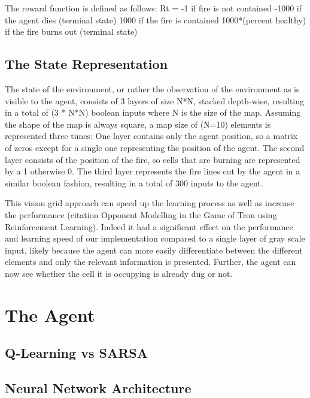 The reward function is defined as follows:
Rt = -1 if fire is not contained
    -1000 if the agent dies (terminal state)
    1000 if the fire is contained
    1000*(percent healthy) if the fire burns out (terminal state)


\subsection{The State Representation}\label{sec:state_rep}
The state of the environment, or rather the observation of the environment as is visible to the agent, consists of 3 layers of size N*N, stacked depth-wise, resulting in a total of (3 * N*N) boolean inputs where N is the size of the map. Assuming the shape of the map is always square, a map size of (N=10) elements is represented three times: One layer contains only the agent position, so a matrix of zeros except for a single one representing the position of the agent. The second layer consists of the position of the fire, so cells that are burning are represented by a 1 otherwise 0. The third layer represents the fire lines cut by the agent in a similar boolean fashion, resulting in a total of 300 inputs to the agent.

This vision grid approach can speed up the learning process as well as increase the performance (citation Opponent Modelling in the Game of Tron using Reinforcement Learning). Indeed it had a significant effect on the performance and learning speed of our implementation compared to a single layer of gray scale input, likely because the agent can more easily differentiate between the different elements and only the relevant information is presented. Further, the agent can now see whether the cell it is occupying is already dug or not.





\section{The Agent}\label{sec:agent}

\subsection{Q-Learning vs SARSA}\label{sec:q_sarsa}

\subsection{Neural Network Architecture}\label{sec:architecture}

